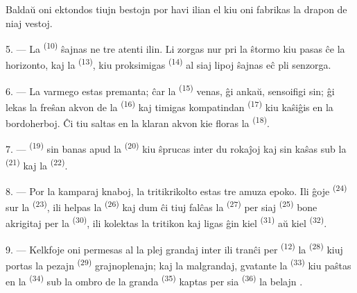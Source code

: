 Baldaŭ oni ektondos tiujn bestojn por havi ilian  el kiu oni
fabrikas la drapon de niaj vestoj.

\VUsaut{5.0mm}
\VUsaut{3.4mm}

5. --- La  \textsuperscript{(10)} ŝajnas ne tre atenti ilin. Li
zorgas nur pri la ŝtormo kiu pasas ĉe la horizonto, kaj la 
\textsuperscript{(13)}, kiu proksimigas  \textsuperscript{(14)}
al siaj lipoj ŝajnas eĉ pli senzorga.

6. --- La varmego estas premanta; ĉar la  \textsuperscript{(15)}
venas, ĝi ankaŭ, sensoifigi sin; ĝi lekas la freŝan akvon de la
 \textsuperscript{(16)} kaj timigas kompatindan
 \textsuperscript{(17)} kiu kaŝiĝis en la bordoherboj. Ĉi tiu
saltas en la klaran akvon kie floras la 
\textsuperscript{(18)}.

7. ---  \textsuperscript{(19)} sin banas apud la
 \textsuperscript{(20)} kiu ŝprucas inter du rokaĵoj kaj sin
kaŝas sub la  \textsuperscript{(21)} kaj la
 \textsuperscript{(22)}.

\VUsaut{5.0mm}
\VUsaut{3.4mm}

8. --- Por la kamparaj knaboj, la tritikrikolto estas tre amuza epoko. Ili ĝoje
 \textsuperscript{(24)} sur la 
\textsuperscript{(23)}, ili helpas la 
\textsuperscript{(26)} kaj dum ĉi tiuj falĉas la 
\textsuperscript{(27)} per siaj  \textsuperscript{(25)} bone
akrigitaj per la  \textsuperscript{(30)}, ili kolektas la
tritikon kaj ligas ĝin kiel  \textsuperscript{(31)} aŭ kiel
 \textsuperscript{(32)}.

9. --- Kelkfoje oni permesas al la plej grandaj inter ili tranĉi per
 \textsuperscript{(12)} la 
\textsuperscript{(28)} kiuj portas la pezajn 
\textsuperscript{(29)} grajnoplenajn; kaj la malgrandaj, gvatante la
 \textsuperscript{(33)} kiu paŝtas en la 
\textsuperscript{(34)} sub la ombro de la granda 
\textsuperscript{(35)} kaptas per sia  \textsuperscript{(36)} la
belajn .

